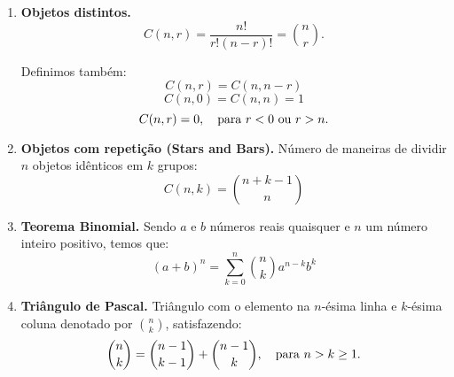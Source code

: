 \begin{enumerate}
    \item \textbf{Objetos distintos.} 
    $$C(n,r) = \frac{n!}{r!(n - r)!} = \binom{n}{r}.$$

    Definimos também:
    $$C(n,r) = C(n, n-r)$$
    $$C(n,0) = C(n,n) = 1$$
    $$C(n,r) = 0, \quad \textnormal{para } r < 0 \textnormal{ ou } r > n.$$

    \item \textbf{Objetos com repetição (Stars and Bars).} Número de maneiras de dividir $n$ objetos idênticos em $k$ grupos:
    $$C(n,k) = \binom{n+k-1}{n}$$

	\item \textbf{Teorema Binomial.} Sendo $a$ e $b$ números reais quaisquer e $n$ um número inteiro positivo, temos que:
	$$(a+b)^n = \sum_{k=0}^{n} \binom{n}{k}a^{n-k}b^{k}$$

    \item \textbf{Triângulo de Pascal.} Triângulo com o elemento na $n$-ésima linha e $k$-ésima coluna denotado por $\binom{n}{k}$, satisfazendo:
    $$\binom{n}{k} = \binom{n-1}{k-1} + \binom{n-1}{k}, \quad \textnormal{para } n > k \ge 1.$$
    
	\end{enumerate}

